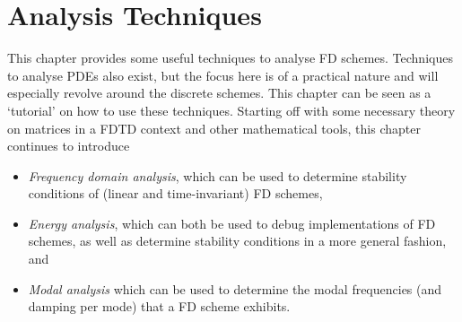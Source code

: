 \chapter{Analysis Techniques}\label{ch:analysis}
This chapter provides some useful techniques to analyse FD schemes. Techniques to analyse PDEs also exist, but the focus here is of a practical nature and will especially revolve around the discrete schemes. This chapter can be seen as a `tutorial' on how to use these techniques. 
Starting off with some necessary theory on matrices in a FDTD context and other mathematical tools, this chapter continues to introduce 
\begin{itemize}
    \item \textit{Frequency domain analysis}, which can be used to determine stability conditions of (linear and time-invariant) FD schemes,
    \item \textit{Energy analysis}, which can both be used to debug implementations of FD schemes, as well as determine stability conditions in a more general fashion, and
    \item \textit{Modal analysis} which can be used to determine the modal frequencies (and damping per mode) that a FD scheme exhibits.
\end{itemize}

